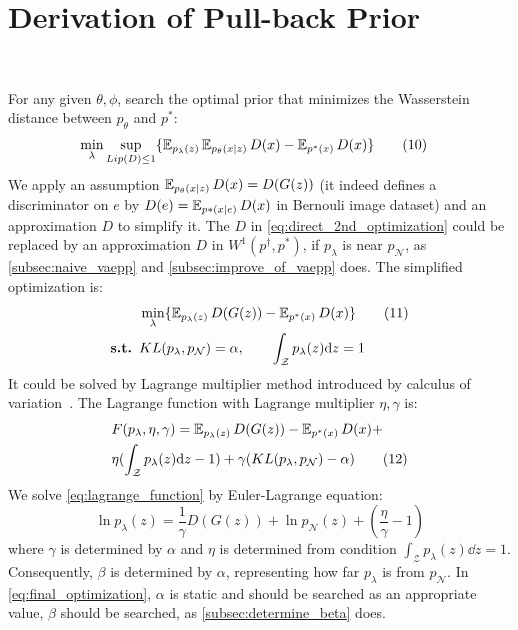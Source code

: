 \section{Derivation of Pull-back Prior}~\label{subsec:inference}

For any given $\theta, \phi$, search the optimal prior that minimizes the Wasserstein distance between $p_\theta$ and $p^*$:
\begin{align*}\label{eq:direct_2nd_optimization}
	& \min_{\lambda} \sup_{Lip(D) \leq 1} \{\operatorname{\mathbb{E}}_{p_\lambda(z)} \operatorname{\mathbb{E}}_{p_\theta(x|z)} D(x)  - \operatorname{\mathbb{E}}_{p^*(x)} D(x)\} 
	\tag{10}
\end{align*}
We apply an assumption $\operatorname{\mathbb{E}}_{p_\theta(x|z)} D(x) = D(G(z))$ (it indeed defines a discriminator on $e$ by $D(e) = \operatorname{\mathbb{E}}_{p*(x|e)} D(x)$ in Bernouli image dataset) and an approximation $D$ to simplify it. The $D$ in \cref{eq:direct_2nd_optimization} could be replaced by an approximation $D$ in $W^1(p^\dag, p^*)$, if $p_\lambda$ is near $p_\mathcal{N}$, as \cref{subsec:naive_vaepp} and \cref{subsec:improve_of_vaepp} does. The simplified optimization is:
\begin{align*}\label{eq:final_optimization}
	& \min_{\lambda} \{\operatorname{\mathbb{E}}_{p_\lambda(z)} D(G(z))  - \operatorname{\mathbb{E}}_{p^*(x)} D(x)\} \tag{11} \\
	{\textbf{s.t. }} & KL(p_\lambda, p_\mathcal{N}) = \alpha, \qquad \int_{\mathcal{Z}} p_\lambda(z) \mathrm{d} z = 1
\end{align*}
It could be solved by Lagrange multiplier method introduced by calculus of variation~\cite{gelfand2000calculus}. The Lagrange function with Lagrange multiplier $\eta, \gamma$ is:
\begin{align*}\label{eq:lagrange_function}
& F(p_\lambda, \eta, \gamma) = \operatorname{\mathbb{E}}_{p_\lambda(z)} D(G(z))  - \operatorname{\mathbb{E}}_{p^*(x)} D(x) + \\
& \eta (\int_{\mathcal{Z}} p_\lambda(z) \mathrm{d} z - 1) + \gamma(KL(p_\lambda, p_\mathcal{N}) - \alpha) \tag{12}
\end{align*}
We solve \cref{eq:lagrange_function} by Euler-Lagrange equation:
\begin{equation*}\label{eq:euler_lagrange_eqaution}
	\ln p_\lambda(z) = \frac{1}{\gamma} D(G(z)) + \ln p_\mathcal{N}(z) + (\frac{\eta}{\gamma} - 1) \tag{13}
\end{equation*}
where $\gamma$ is determined by $\alpha$ and $\eta$ is determined from condition $\int_{\mathcal{Z}} p_\lambda(z) \dd z = 1$.
Consequently, $\beta$ is determined by $\alpha$, representing how far $p_\lambda$ is from $p_\mathcal{N}$. In \cref{eq:final_optimization}, $\alpha$ is static and should be searched as an appropriate value, \IE $\beta$ should be searched, as \cref{subsec:determine_beta} does. 
 
 